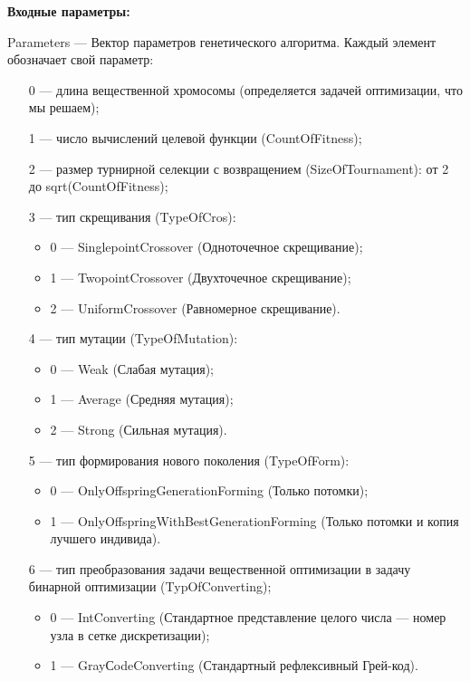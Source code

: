 \textbf{Входные параметры:}
 
Parameters --- Вектор параметров генетического алгоритма. Каждый элемент обозначает свой параметр:
 
 \begin{itemize}
 \item   [0] --- длина вещественной хромосомы (определяется задачей оптимизации, что мы решаем);
  \item   [1] --- число вычислений целевой функции (CountOfFitness);
   \item [2] --- размер турнирной селекции  с возвращением  (SizeOfTournament): от 2 до sqrt(CountOfFitness);
 
 \item [3] --- тип скрещивания (TypeOfCros):
  \begin{itemize}
       \item 0 --- SinglepointCrossover (Одноточечное скрещивание);
 
       \item 1 --- TwopointCrossover (Двухточечное скрещивание);
 
       \item 2 --- UniformCrossover (Равномерное скрещивание).
	    \end{itemize}
 
 \item [4] --- тип мутации (TypeOfMutation):
  \begin{itemize}
       \item 0 --- Weak (Слабая мутация);
 
       \item 1 --- Average (Средняя мутация);
 
       \item 2 --- Strong (Сильная мутация).
	    \end{itemize}
 
 \item [5] --- тип формирования нового поколения (TypeOfForm):
  \begin{itemize}
       \item 0 --- OnlyOffspringGenerationForming (Только потомки);
 
       \item 1 --- OnlyOffspringWithBestGenerationForming (Только потомки и копия лучшего индивида).
	    \end{itemize}
 \item [6] --- тип преобразования задачи вещественной оптимизации в задачу бинарной оптимизации (TypOfConverting);
   \begin{itemize}
        \item 0 --- IntConverting (Стандартное представление целого числа –-- номер узла в сетке дискретизации);
        \item 1 --- GrayСodeConverting (Стандартный рефлексивный Грей-код).
			    \end{itemize}
 \end{itemize}
 
